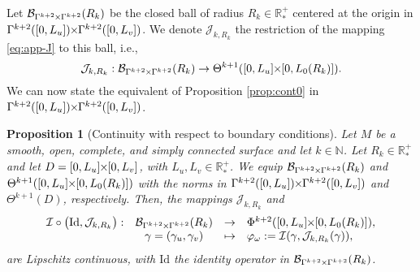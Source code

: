 \documentclass{article}
\newcommand{\I}{\mathcal{I}}
\newcommand{\PLH}{{\mkern-1mu\times\mkern-1mu}}
\newcommand{\Times}{\PLH}
\newcommand{\R}{\mathbb{R}}
\newcommand{\surf}{M}
\newcommand{\EN}{\mathbb{N}}
\newcommand{\J}{\mathcal{J}}
\newtheorem{proposition}[theorem]{Proposition}
\theoremstyle{remark}
\theoremstyle{prpart}
\newcommand{\B}{\mathcal{B}}
\newcommand{\Id}{\mathrm{Id}}
\begin{document}
Let $\B_{\Gamma^{k+2}\Times \Gamma^{k+2}}(R_k)$ be the closed ball of radius $R_k\in\R^+_\ast$ centered at the origin in $\Gamma^{k+2}([0,L_u])\Times \Gamma^{k+2}([0,L_v])$. We denote $\J_{k,R_k}$ the restriction of the mapping \eqref{eq:app-J} to this ball, i.e.,
\begin{equation*}
  \J_{k,R_k} : \B_{\Gamma^{k+2}\Times \Gamma^{k+2}}(R_k) \to \Theta^{k+1}([0,L_u]\Times[0,L_0(R_k)]).
\end{equation*}
We can now state the equivalent of Proposition \ref{prop:cont0} in $\Gamma^{k+2}([0,L_u])\Times\Gamma^{k+2}([0,L_v])$.
\begin{proposition}[Continuity with respect to boundary conditions]\label{prop:cont1}
Let $\surf$ be a smooth, open, complete, and simply connected surface and let $k\in\EN$. Let $R_k\in\R_\ast^+$ and let $D=[0,L_u]\Times[0,L_v]$, with $L_u,L_v\in\R^+_\ast$. We equip $\B_{\Gamma^{k+2}\Times \Gamma^{k+2}}(R_k)$ and $\Theta^{k+1}([0,L_u]\Times[0,L_0(R_k)])$ with the norms in $\Gamma^{k+2}([0,L_u])\Times \Gamma^{k+2}([0,L_v])$ and $\Theta^{k+1}(D)$, respectively. Then, the mappings $\J_{k,R_k}$ and 
\begin{equation*}
\begin{array}{lccl}
\I\circ \big(\Id,\J_{k,R_k}\big): &\B_{\Gamma^{k+2}\Times \Gamma^{k+2}}(R_k) &\to& \Phi^{k+2}([0,L_u]\Times [0,L_0(R_k)]),\\
  & \gamma=(\gamma_u,\gamma_v) &\mapsto& \varphi_{\omega}:=\I(\gamma,\J_{k,R_k}(\gamma)),
\end{array}
\end{equation*}
 are Lipschitz continuous, with $\Id$ the identity operator in $\B_{\Gamma^{k+2}\Times \Gamma^{k+2}}(R_k)$.
\end{proposition}
\end{document}
